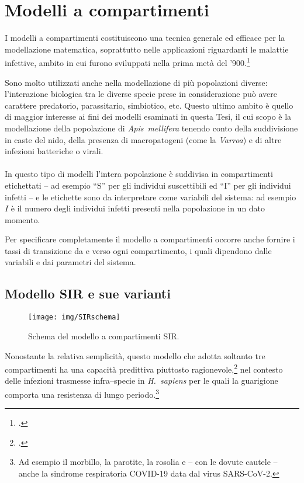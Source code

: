 \section{Modelli a compartimenti}
I modelli a compartimenti costituiscono una tecnica generale ed efficace per
la modellazione matematica, soprattutto nelle applicazioni riguardanti le malattie infettive,
ambito in cui furono sviluppati nella prima metà del '900.\footcite{kmk,kdg}

Sono molto utilizzati anche nella modellazione di più popolazioni diverse: l'interazione biologica tra le diverse specie
prese in considerazione può avere carattere predatorio, parassitario, simbiotico, etc.
Questo ultimo ambito è quello di maggior interesse ai fini dei modelli esaminati in questa Tesi, il cui scopo è
la modellazione della popolazione di \emph{Apis~mellifera} tenendo conto della suddivisione in caste del nido, della
presenza di macropatogeni (come la \emph{Varroa}) e di altre infezioni batteriche o virali.

\paragraph{}
In questo tipo di modelli l'intera popolazione è suddivisa in compartimenti etichettati -- ad esempio ``S'' per gli
individui suscettibili ed ``I'' per gli individui infetti -- e le etichette sono da interpretare come variabili del sistema:
ad esempio $I$ è il numero degli individui infetti presenti nella popolazione in un dato momento.

Per specificare completamente il modello a compartimenti occorre anche fornire i tassi di transizione da e verso ogni
compartimento, i quali dipendono dalle variabili e dai parametri del sistema.

\subsection{Modello SIR e sue varianti}
\begin{figure}[hbt]
    \centering
    \texttt{[image: img/SIRschema]}

    \caption{Schema del modello a compartimenti SIR.}
    \label{img:SIRscheme}
\end{figure}

Nonostante la relativa semplicità, questo modello che adotta soltanto tre compartimenti ha una capacità predittiva
piuttosto ragionevole,\footcite{chinaVirus} nel contesto delle infezioni trasmesse infra--specie in \emph{H.~sapiens}
per le quali la guarigione comporta una resistenza di lungo periodo.\footnote{Ad esempio il morbillo, la parotite,
la rosolia e -- con le dovute cautele -- anche la sindrome respiratoria COVID-19 data dal virus SARS-CoV-2.}

